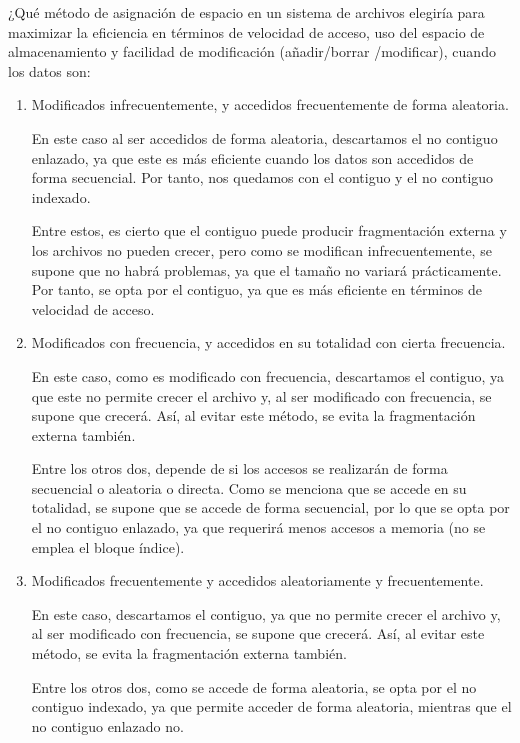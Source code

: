 \begin{ejercicio}
¿Qué método de asignación de espacio en un sistema de archivos elegiría para maximizar la eficiencia en términos de velocidad de acceso, uso del espacio de almacenamiento y facilidad de modificación (añadir/borrar /modificar), cuando los datos son:
\begin{enumerate}
    \item Modificados infrecuentemente, y accedidos frecuentemente de forma aleatoria.
    
    En este caso al ser accedidos de forma aleatoria, descartamos el no contiguo enlazado, ya que
    este es más eficiente cuando los datos son accedidos de forma secuencial. Por tanto, nos quedamos
    con el contiguo y el no contiguo indexado.

    Entre estos, es cierto que el contiguo puede producir fragmentación externa y los archivos no pueden crecer,
    pero como se modifican infrecuentemente, se supone que no habrá problemas, ya que el tamaño no variará prácticamente.
    Por tanto, se opta por el contiguo, ya que es más eficiente en términos de velocidad de acceso.


    \item Modificados con frecuencia, y accedidos en su totalidad con cierta frecuencia.
    
    En este caso, como es modificado con frecuencia, descartamos el contiguo, ya que este no permite crecer el archivo
    y, al ser modificado con frecuencia, se supone que crecerá. Así, al evitar este método, se evita la fragmentación externa también.

    Entre los otros dos, depende de si los accesos se realizarán de forma secuencial o aleatoria o directa.
    Como se menciona que se accede en su totalidad, se supone que se accede de forma secuencial, por lo que se opta
    por el no contiguo enlazado, ya que requerirá menos accesos a memoria (no se emplea el bloque índice).

    \item Modificados frecuentemente y accedidos aleatoriamente y frecuentemente.
    
    En este caso, descartamos el contiguo, ya que no permite crecer el archivo y, al ser modificado con frecuencia,
    se supone que crecerá. Así, al evitar este método, se evita la fragmentación externa también.
    
    Entre los otros dos, como se accede de forma aleatoria, se opta por el no contiguo indexado, ya que
    permite acceder de forma aleatoria, mientras que el no contiguo enlazado no.
\end{enumerate}
\end{ejercicio}

